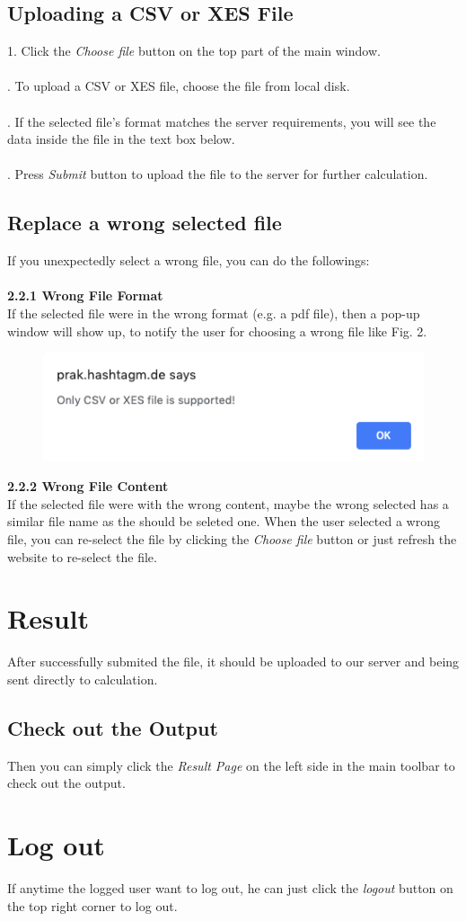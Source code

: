 \documentclass[runningheads]{llncs}
\begin{document}
\subsection{Uploading a CSV or XES File}

1. Click the \textit{Choose file} button on the top part of the main window.\\\\
. To upload a CSV or XES file, choose the file from local disk.\\\\
. If the selected file's format matches the server requirements, you will see the data inside the file in the text box below.\\\\
. Press \textit{Submit} button to upload the file to the server for further calculation.

\subsection{Replace a wrong selected file}
If you unexpectedly select a wrong file, you can do the followings:\\\\
\noindent
\textbf{2.2.1 Wrong File Format\\}
If the selected file were in the wrong format (e.g. a pdf file), then a pop-up window will show up, to notify the user for choosing a wrong file like Fig. 2.
\begin{figure}[h]	
	\centering
	\includegraphics[scale=0.5]{wrong.png}
	\caption{}
	\label{fig:label}
\end{figure}

\noindent
\textbf{2.2.2 Wrong File Content\\}
If the selected file were with the wrong content, maybe the wrong selected has a similar file name as the should be seleted one. When the user selected a wrong file, you can re-select the file by clicking the \textit{Choose file} button or just refresh the website to re-select the file.

\section{Result}
After successfully submited the file, it should be uploaded to our server and being sent directly to calculation. 

\subsection{Check out the Output}
Then you can simply click the \textit{Result Page} on the left side in the main toolbar to check out the output.

\section{Log out}
If anytime the logged user want to log out, he can just click the \textit{logout} button on the top right corner to log out.
\end{document}
